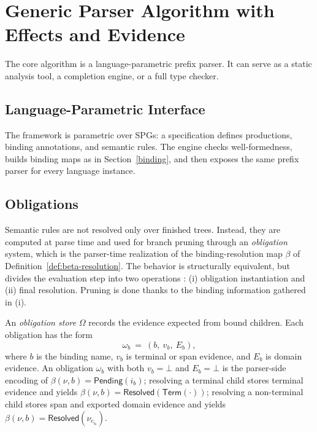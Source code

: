 

\section{Generic Parser Algorithm with Effects and Evidence}
\label{sec:prefix-parsing-algorithm}

The core algorithm is a language-parametric prefix parser. It can serve as a static analysis tool, a completion engine, or a full type checker.

\subsection{Language-Parametric Interface}

The framework is parametric over SPGs: a specification defines productions, binding annotations, and semantic rules. The engine checks well-formedness, builds binding maps as in Section~\ref{binding}, and then exposes the same prefix parser for every language instance.

\subsection*{Obligations}


Semantic rules are not resolved only over finished trees. Instead, they are computed at parse time and used for branch pruning through an \emph{obligation} system, which is the parser-time realization of the binding-resolution map $\beta$ of Definition~\ref{def:beta-resolution}. The behavior is structurally equivalent, but divides the evaluation step into two operations : (i) obligation instantiation and (ii) final resolution. Pruning is done thanks to the binding information gathered in (i).

\begin{definition}
\label{def:obligation-store}
An \emph{obligation store} $\Omega$ records the evidence expected from bound children. Each obligation has the form
\[
  \omega_b ~=~ (b,~v_b,~E_b),
\]
where $b$ is the binding name, $v_b$ is terminal or span evidence, and $E_b$ is domain evidence. An obligation $\omega_b$ with both $v_b = \bot$ and $E_b = \bot$ is the parser-side encoding of $\beta(\nu,b) = \mathsf{Pending}(i_b)$; resolving a terminal child stores terminal evidence and yields $\beta(\nu,b) = \mathsf{Resolved}(\mathsf{Term}(\cdot))$; resolving a non-terminal child stores span and exported domain evidence and yields $\beta(\nu,b) = \mathsf{Resolved}(\nu_{c_{i_b}})$.
\end{definition}

